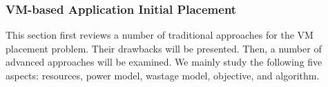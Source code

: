 

\subsubsection{VM-based Application Initial Placement}
\label{initial_placement}
This section first reviews a number of traditional approaches for the VM placement problem. Their drawbacks will be presented. Then, a number of advanced approaches will be examined. We mainly study the following five aspects: resources, power model, wastage model, objective, and algorithm.

